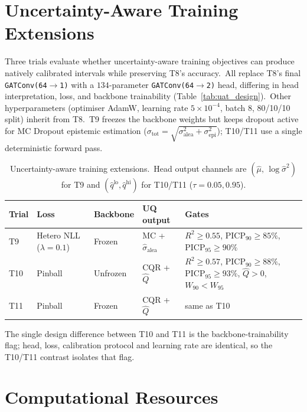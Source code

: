 \section{Uncertainty-Aware Training Extensions}\label{sec:uat_design}

Three trials evaluate whether uncertainty-aware training objectives can produce natively calibrated intervals while preserving T8's accuracy.\ All replace T8's final \texttt{GATConv(64$\to$1)} with a $134$-parameter \texttt{GATConv(64$\to$2)} head, differing in head interpretation, loss, and backbone trainability (Table~\ref{tab:uat_design}).\ Other hyperparameters (optimiser AdamW, learning rate $5\times10^{-4}$, batch 8, 80/10/10 split) inherit from T8.\ T9 freezes the backbone weights but keeps dropout active for MC Dropout epistemic estimation ($\sigma_\text{tot} = \sqrt{\sigma_\text{alea}^2 + \sigma_\text{epi}^2}$); T10/T11 use a single deterministic forward pass.

\begin{table}[htbp]
\centering
\caption[UAT design summary]{Uncertainty-aware training extensions.\ Head output channels are $(\hat\mu,\,\log\hat\sigma^2)$ for T9 and $(\hat q^\text{lo}, \hat q^\text{hi})$ for T10/T11 ($\tau = 0.05, 0.95$).}
\label{tab:uat_design}
\footnotesize
\setlength{\tabcolsep}{4pt}
\renewcommand{\arraystretch}{1.15}
\begin{tabular}{p{0.9cm}p{2.4cm}p{2.0cm}p{1.5cm}p{4.8cm}}
\toprule
Trial & Loss & Backbone & UQ output & Gates \\
\midrule
T9\label{sec:t9_design}  & Hetero NLL ($\lambda = 0.1$)~\cite{seitzer2022pitfalls} & Frozen & MC + $\hat\sigma_\text{alea}$ & $R^2 \geq 0.55$, $\mathrm{PICP}_{90} \geq 85\%$, $\mathrm{PICP}_{95} \geq 90\%$ \\
T10\label{sec:t10_design} & Pinball & Unfrozen & CQR + $\hat Q$ & $R^2 \geq 0.57$, $\mathrm{PICP}_{90} \geq 88\%$, $\mathrm{PICP}_{95} \geq 93\%$, $\hat Q > 0$, $W_{90} < W_{95}$ \\
T11\label{sec:t11_design} & Pinball & Frozen & CQR + $\hat Q$ & same as T10 \\
\bottomrule
\end{tabular}
\end{table}

The single design difference between T10 and T11 is the backbone-trainability flag; head, loss, calibration protocol and learning rate are identical, so the T10/T11 contrast isolates that flag.

\section{Computational Resources}\label{sec:resources}

